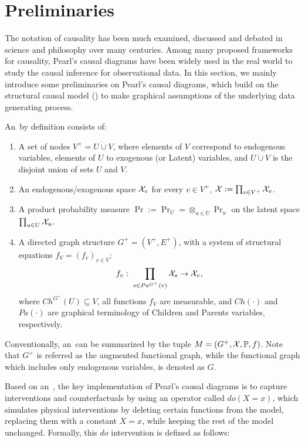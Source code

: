 \section{Preliminaries}

 
The notation of causality has been much examined, discussed and debated in science and philosophy over many centuries. Among many proposed frameworks for causality, Pearl's causal diagrams have been widely used in the real world to study the causal inference for observational data. In this section, we mainly introduce some preliminaries on Pearl's causal diagrams, which build on the structural causal model (\SCM) to make graphical assumptions of the underlying data generating process. 




\begin{Def}
	\label{SCM-def}
	An \SCM\,by definition consists of: 
	\begin{enumerate}
		\setlength\itemsep{0em}
		\item A set of nodes $V^+=U \dot \cup V$, where elements of $V$ correspond to endogenous variables, elements of $U$ to exogenous (or Latent) variables, and 
		$U \dot \cup V$ is the disjoint union of sets $U$ and $V$.
		
		\item An endogenous/exogenous space $\mathcal{X}_v$ for every $v \in V^+$, $\mathcal{X}:=\prod_{v \in V^+}\mathcal{X}_v$.
		
		\item A product probability measure $\Pr:=\Pr_U=\otimes_{u \in U} \Pr_u$ on the latent space $\prod_{u \in U} \mathcal{X}_u$. 
		
		\item A directed graph structure $G^+=(V^+, E^+)$, with a system of structural equations  $f_V = (f_v)_{v \in V}$:
		\[f_v: \; \prod_{s \in  Pa^{G^+}(v)}\mathcal{X}_s \to \mathcal{X}_v,\]
		where $Ch^{G^+}(U) \subseteq V$, all functions $f_V$ are measurable, and $Ch(\cdot )$ and $Pa(\cdot)$ are graphical terminology of Children and Parents variables, respectively. 
	\end{enumerate}
	Conventionally, an \SCM\,can be summarized by the tuple $M=(G^+,\mathcal{X},\mathbb{P}, f)$. Note that $G^+$ is referred as the augmented functional graph, while the functional graph which includes only endogenous variables, is denoted as $G$. 
\end{Def}

Based on an \SCM\,, the key implementation of Pearl's causal diagrams is to capture interventions and counterfactuals by using an operator called  $do(X=x)$, which  
simulates physical interventions by deleting certain functions from the model, replacing them with a constant $X=x$, while keeping the rest of the model unchanged.
Formally, this $do$ intervention is defined as follows: 

